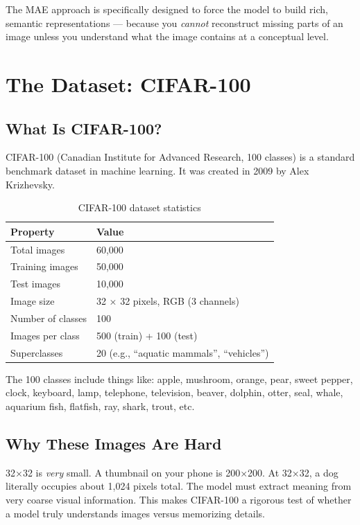 \documentclass[12pt, a4paper]{report}
\begin{document}
The MAE approach is specifically designed to force the model to build rich, semantic representations — because you \emph{cannot} reconstruct missing parts of an image unless you understand what the image contains at a conceptual level.

\chapter{The Dataset: CIFAR-100}

\section{What Is CIFAR-100?}

CIFAR-100 (Canadian Institute for Advanced Research, 100 classes) is a standard benchmark dataset in machine learning. It was created in 2009 by Alex Krizhevsky.

\begin{table}[h]
\centering
\begin{tabular}{ll}
\toprule
\textbf{Property} & \textbf{Value} \\
\midrule
Total images & 60,000 \\
Training images & 50,000 \\
Test images & 10,000 \\
Image size & 32 × 32 pixels, RGB (3 channels) \\
Number of classes & 100 \\
Images per class & 500 (train) + 100 (test) \\
Superclasses & 20 (e.g., ``aquatic mammals'', ``vehicles'') \\
\bottomrule
\end{tabular}
\caption{CIFAR-100 dataset statistics}
\end{table}

The 100 classes include things like: apple, mushroom, orange, pear, sweet pepper, clock, keyboard, lamp, telephone, television, beaver, dolphin, otter, seal, whale, aquarium fish, flatfish, ray, shark, trout, etc.

\section{Why These Images Are Hard}

32×32 is \emph{very} small. A thumbnail on your phone is 200×200. At 32×32, a dog literally occupies about 1,024 pixels total. The model must extract meaning from very coarse visual information. This makes CIFAR-100 a rigorous test of whether a model truly understands images versus memorizing details.
\end{document}
